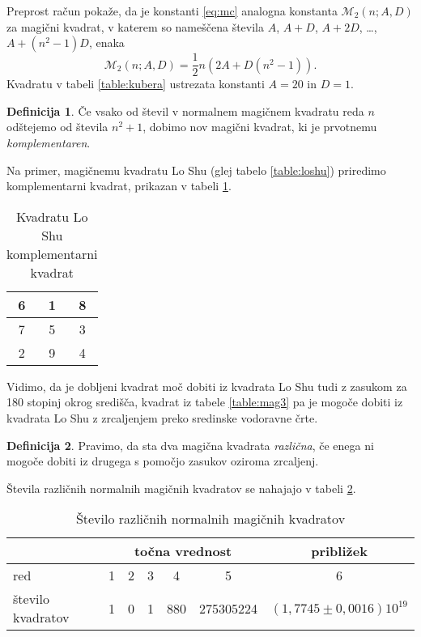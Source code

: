 \documentclass[a4paper,12pt]{article}
\newcommand{\m}{\mathcal{M}_2}
\newcommand{\pojem}[1]{\emph{\color{purple}#1}}
\theoremstyle{definition}
\newtheorem{definicija}{Definicija}
\theoremstyle{plain}
\newenvironment{magic}[3]
{
   \begin{table}[!ht]
      \centering
      \caption{#2}
      \label{#3}
      \large
      \begin{tabular}{|*{#1}{c|}}
      \hline
}
{
      \end{tabular}
      \normalsize
   \end{table}
}
\begin{document}
Preprost račun pokaže, da je konstanti \eqref{eq:mc} analogna konstanta
$\m(n;A,D)$ za magični kvadrat, v katerem so nameščena števila
$A$, $A+D$, $A+2D$, \dots, $A+(n^2-1)D$, enaka
\[
   \m(n;A,D) = \frac{1}{2} n \left(2A+D(n^2-1)\right).
\]
Kvadratu v tabeli \ref{table:kubera} ustrezata konstanti $A=20$ in $D=1$.

\begin{definicija}
   Če vsako od števil v normalnem magičnem kvadratu reda $n$ odštejemo
   od števila $n^2+1$, dobimo nov magični kvadrat, ki je prvotnemu
   \pojem{komplementaren}.
\end{definicija}

Na primer, magičnemu kvadratu Lo Shu (glej tabelo \ref{table:loshu}) priredimo
komplementarni kvadrat, prikazan v tabeli \ref{table:closhu}.

\begin{magic}{3}{Kvadratu Lo Shu komplementarni kvadrat}{table:closhu}
   6 & 1 & 8 \\\hline
   7 & 5 & 3 \\\hline
   2 & 9 & 4 \\\hline
\end{magic}

Vidimo, da je dobljeni kvadrat moč dobiti iz kvadrata Lo Shu tudi z zasukom za
180 stopinj okrog središča, kvadrat iz tabele \ref{table:mag3} pa je mogoče dobiti
iz kvadrata Lo Shu z zrcaljenjem preko sredinske vodoravne črte.

\begin{definicija}
   Pravimo, da sta dva magična kvadrata \pojem{različna}, če enega ni mogoče dobiti
   iz drugega s pomočjo zasukov oziroma zrcaljenj.
\end{definicija}

Števila različnih normalnih magičnih kvadratov se nahajajo v tabeli \ref{table:stevila}.

\begin{table}[!ht]
   \centering
   \caption{Število različnih normalnih magičnih kvadratov}
   \label{table:stevila}
   \begin{tabular}{lcccccc}\toprule
      & \multicolumn{5}{c}{točna vrednost} & približek \\
      \midrule
      red & 1 & 2 & 3 & 4 & 5 & 6 \\
      število kvadratov & 1 & 0 & 1 & 880 & 275305224 & $(1{,}7745 \pm 0{,}0016)10^{19}$ \\
      \bottomrule
   \end{tabular}
\end{table}
\end{document}

